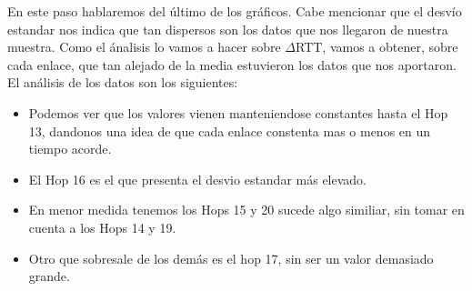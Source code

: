 En este paso hablaremos del \'ultimo de los gr\'aficos. Cabe mencionar que el desv\'io estandar nos indica que tan dispersos son los datos que nos llegaron de nuestra muestra. Como el \'analisis lo vamos a hacer sobre $\Delta$RTT, vamos a obtener, sobre cada enlace, que tan alejado de la media estuvieron los datos que nos aportaron. El an\'alisis de los datos son los siguientes:
\begin{itemize}
\item Podemos ver que los valores vienen manteniendose constantes hasta el Hop 13, dandonos una idea de que cada enlace constenta mas o menos en un tiempo acorde. 
\item El Hop 16 es el que presenta el desvio estandar m\'as elevado.
\item En menor medida tenemos los Hops 15 y 20 sucede algo similiar, sin tomar en cuenta a los Hops 14 y 19.
\item Otro que sobresale de los dem\'as es el hop 17, sin ser un valor demasiado grande.
\end{itemize}



